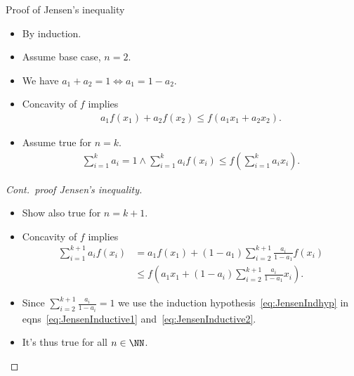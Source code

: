 \begin{frame}
  \begin{block}{Proof of Jensen's inequality}
    \begin{itemize}
      \item By induction.
      \item Assume base case, \(n = 2\).
      \item We have \(a_1 + a_2 = 1 \iff a_1 = 1 - a_2\).
      \item Concavity of \(f\) implies
        \begin{align*}
          a_1f(x_1) + a_2f(x_2) \leq f(a_1x_1 + a_2x_2).
        \end{align*}

      \item Assume true for \(n=k\).
        \begin{align}
          \label{eq:JensenIndhyp}
          \sum_{i=1}^k a_i = 1 \land
          \sum_{i=1}^k a_i f(x_i) \leq f\left( \sum_{i=1}^k a_i x_i\right).
        \end{align}
    \end{itemize}
  \end{block}
\end{frame}

\begin{frame}
  \begin{proof}[Cont.\ proof Jensen's inequality]
    \begin{itemize}
      \item Show also true for \(n = k+1\).
      \item Concavity of \(f\) implies
        \begin{align}
          \label{eq:JensenInductive1}
          \sum_{i=1}^{k+1} a_i f(x_i) &=
            a_1f(x_1) + (1-a_1)\sum_{i=2}^{k+1} \frac{a_i}{1-a_1}f(x_i) \\
          \label{eq:JensenInductive2}
            &\leq
              f\left(a_1x_1 + (1-a_i)\sum_{i=2}^{k+1}
                \frac{a_i}{1-a_1} x_i\right).
        \end{align}
      \item Since \(\sum_{i=2}^{k+1}\frac{a_i}{1-a_i} = 1\) we use the 
        induction hypothesis~\eqref{eq:JensenIndhyp} in eqns~\eqref{eq:JensenInductive1} and~\eqref{eq:JensenInductive2}.
      \item It's thus true for all \(n\in \NN\).
    \end{itemize}
  \end{proof}
\end{frame}


